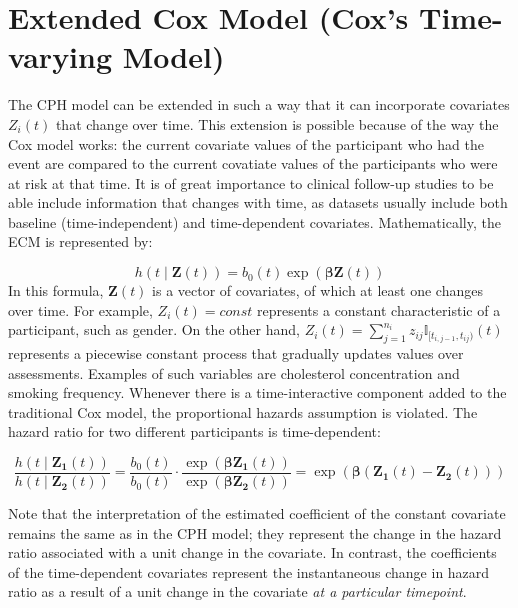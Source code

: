 \section{Extended Cox Model (Cox's Time-varying Model)}
\label{section:methodology:ecm}
The CPH model can be extended in such a way that it can incorporate covariates $Z_i(t)$ that change over time. This extension is possible because of the way the Cox model works: the current covariate values of the participant who had the event are compared to the current covatiate values of the participants who were at risk at that time. It is of great importance to clinical follow-up studies to be able include information that changes with time, as datasets usually include both baseline (time-independent) and time-dependent covariates. Mathematically, the ECM is represented by:  

$$
h(t \mid \mathbf{Z}(t)) =  b_0(t) \exp(\mathbf{\beta}\mathbf{Z}(t)) 
$$
In this formula, $\mathbf{Z}(t)$ is a vector of covariates, of which at least one changes over time. For example, $Z_{i}(t) = \textit{const}$ represents a constant characteristic of a participant, such as gender. On the other hand, $Z_i(t) = \sum_{j=1}^{n_i} z_{ij} \mathbb{I}_{[t_{i,j-1}, t_{ij})}(t)$ represents a piecewise constant process that gradually updates values over assessments. Examples of such variables are cholesterol concentration and smoking frequency. Whenever there is a time-interactive component added to the traditional Cox model, the proportional hazards assumption is violated. The hazard ratio for two different participants is time-dependent: 

$$\frac{h(t \mid \mathbf{Z_1}(t))}{h(t \mid \mathbf{Z_2}(t))} = \frac{b_0(t)}{b_0(t)} \cdot \frac{\exp(\mathbf{\beta}\mathbf{Z_1}(t))}{\exp(\mathbf{\beta}\mathbf{Z_2}(t))} = \exp(\mathbf{\beta} (\mathbf{Z_1}(t) - \mathbf{Z_2}(t) )) $$ 

Note that the interpretation of the estimated coefficient of the constant covariate remains the same as in the CPH model; they represent the change in the hazard ratio associated with a unit change in the covariate. In contrast, the coefficients of the time-dependent covariates represent the instantaneous change in hazard ratio as a result of a unit change in the covariate \textit{at a particular timepoint}. %

